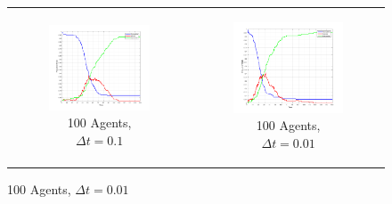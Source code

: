 \begin{figure}
\begin{center}
	\begin{tabular}{c c}
		\begin{subfigure}[b]{0.3\textwidth}
			\centering
			\includegraphics[width=1\textwidth, angle=0]{./fig/step2_yampa/SIR_100agents_150t_01dt.png}
			\caption{100 Agents, $\Delta t = 0.1$}
			\label{fig:sir_abs_approximating_01dt_100agents}
		\end{subfigure}
    	&
		\begin{subfigure}[b]{0.3\textwidth}
			\centering
			\includegraphics[width=1\textwidth, angle=0]{./fig/step2_yampa/SIR_100agents_150t_001dt.png}
			\caption{100 Agents, $\Delta t = 0.01$}
			\label{fig:sir_abs_approximating_001dt_500agents}
		\end{subfigure}
    	

\end{tabular}
\end{center}
\end{figure}
